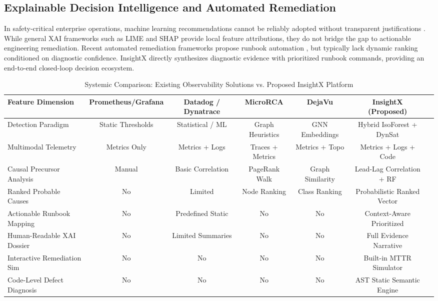 \documentclass[conference]{IEEEtran}
\begin{document}
\subsection{Explainable Decision Intelligence and Automated Remediation}
In safety-critical enterprise operations, machine learning recommendations cannot be reliably adopted without transparent justifications \cite{ribeiro2016should, lundberg2017unified}. While general XAI frameworks such as LIME and SHAP provide local feature attributions, they do not bridge the gap to actionable engineering remediation. Recent automated remediation frameworks propose runbook automation \cite{salfner2010survey}, but typically lack dynamic ranking conditioned on diagnostic confidence. InsightX directly synthesizes diagnostic evidence with prioritized runbook commands, providing an end-to-end closed-loop decision ecosystem.

\begin{table}[t]
\centering
\caption{Systemic Comparison: Existing Observability Solutions vs. Proposed InsightX Platform}
\label{tab:comparison}
\begin{tabular}{lcccccc}
\toprule
\textbf{Feature Dimension} & \textbf{Prometheus/Grafana} & \textbf{Datadog / Dynatrace} & \textbf{MicroRCA \cite{chen2020microrca}} & \textbf{DejaVu \cite{li2022dejavu}} & \textbf{InsightX (Proposed)} \\
\midrule
Detection Paradigm & Static Thresholds & Statistical / ML & Graph Heuristics & GNN Embeddings & Hybrid IsoForest + DynSat \\
Multimodal Telemetry & Metrics Only & Metrics + Logs & Traces + Metrics & Metrics + Topo & Metrics + Logs + Code \\
Causal Precursor Analysis & Manual & Basic Correlation & PageRank Walk & Graph Similarity & Lead-Lag Correlation + RF \\
Ranked Probable Causes & No & Limited & Node Ranking & Class Ranking & Probabilistic Ranked Vector \\
Actionable Runbook Mapping & No & Predefined Static & No & No & Context-Aware Prioritized \\
Human-Readable XAI Dossier & No & Limited Summaries & No & No & Full Evidence Narrative \\
Interactive Remediation Sim & No & No & No & No & Built-in MTTR Simulator \\
Code-Level Defect Diagnosis & No & No & No & No & AST Static Semantic Engine \\
\bottomrule
\end{tabular}
\end{table}
\end{document}
